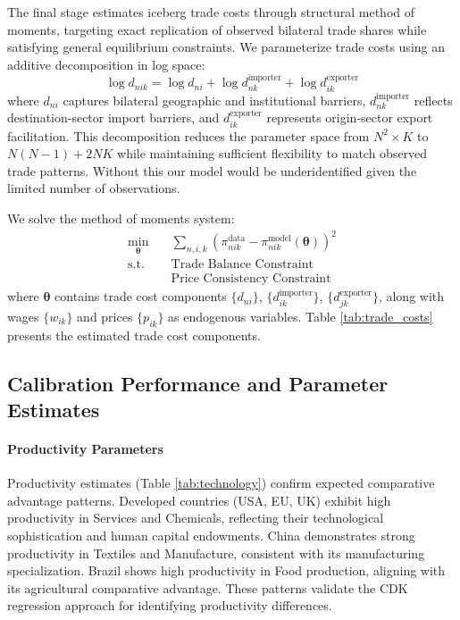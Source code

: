 The final stage estimates iceberg trade costs through structural method of moments, targeting exact replication of observed bilateral trade shares while satisfying general equilibrium constraints. We parameterize trade costs using an additive decomposition in log space:
\begin{equation}
\log d_{nik} = \log d_{ni} + \log d_{nk}^{\text{importer}} + \log d_{ik}^{\text{exporter}}
\end{equation}
where $d_{ni}$ captures bilateral geographic and institutional barriers, $d_{nk}^{\text{importer}}$ reflects destination-sector import barriers, and $d_{ik}^{\text{exporter}}$ represents origin-sector export facilitation. This decomposition reduces the parameter space from $N^2 \times K$ to $N(N-1) + 2NK$ while maintaining sufficient flexibility to match observed trade patterns. Without this our model would be underidentified given the limited number of observations.

We solve the method of moments system:
\begin{align*}
\min_{\boldsymbol{\theta}} &\quad \sum_{n,i,k} \left( \pi_{nik}^{\text{data}} - \pi_{nik}^{\text{model}}(\boldsymbol{\theta}) \right)^2 \\
\text{s.t.} & \quad \text{Trade Balance Constraint} \\
& \quad \text{Price Consistency Constraint}
\end{align*}
where $\boldsymbol{\theta}$ contains trade cost components $\{d_{ni}\}$, $\{d_{ik}^{\text{importer}}\}$, $\{d_{jk}^{\text{exporter}}\}$, along with wages $\{w_{ik}\}$ and prices $\{p_{ik}\}$ as endogenous variables. Table \ref{tab:trade_costs} presents the estimated trade cost components.

\subsection{Calibration Performance and Parameter Estimates}

\paragraph{Productivity Parameters} Productivity estimates (Table \ref{tab:technology}) confirm expected comparative advantage patterns. Developed countries (USA, EU, UK) exhibit high productivity in Services and Chemicals, reflecting their technological sophistication and human capital endowments. China demonstrates strong productivity in Textiles and Manufacture, consistent with its manufacturing specialization. Brazil shows high productivity in Food production, aligning with its agricultural comparative advantage. These patterns validate the CDK regression approach for identifying productivity differences.

